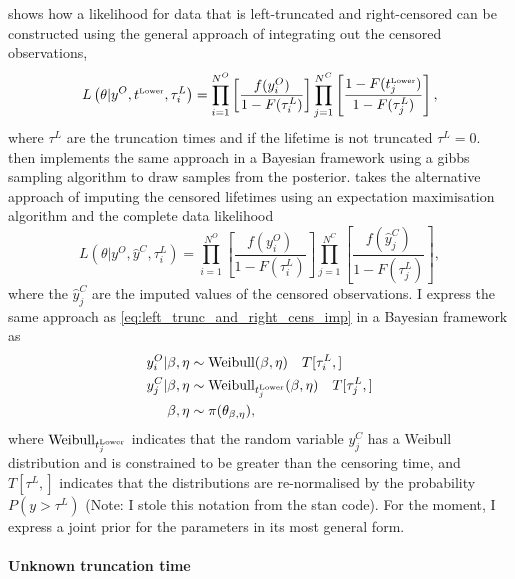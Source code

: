 \citet{hong2009} shows how a likelihood for data that is left-truncated and right-censored can be constructed using the general approach of integrating out the censored observations,
\begin{equation}
    \label{eq:left_trunc_and_right_cens_int}
    L\left(\theta|y^O, t^{\hbox{\tiny{Lower}}}, \tau^L_i\right) = \prod^{N^O}_{i = 1}\left[\frac{f(y^O_i)}{1 - F(\tau^L_i)} \right] \prod^{N^C}_{j = 1}\left[\frac{1 - F(t^{\hbox{\tiny{Lower}}}_j)}{1 - F(\tau^L_j)}\right],
\end{equation}
where $\tau^L$ are the truncation times and if the lifetime is not truncated $\tau^L = 0$. \citet{kundu2016} then implements the same approach in a Bayesian framework using a gibbs sampling algorithm to draw samples from the posterior. \citet{mitra2013} takes the alternative approach of imputing the censored lifetimes using an expectation maximisation algorithm and the complete data likelihood
\begin{equation}
    \label{eq:left_trunc_and_right_cens_imp}
    L\left(\theta|y^O, \hat{y}^C, \tau^L_i\right) = \prod^{N^O}_{i = 1}\left[\frac{f(y^O_i)}{1 - F(\tau^L_i)} \right] \prod^{N^C}_{j = 1}\left[\frac{f(\hat{y}^C_j)}{1 - F(\tau^L_j)}\right],
\end{equation}
where the $\hat{y}^C_j$ are the imputed values of the censored observations. I express the same approach as \ref{eq:left_trunc_and_right_cens_imp} in a Bayesian framework as
\begin{align*}
    y^O_i|\beta, \eta & \sim \hbox{Weibull}(\beta, \eta) \quad T[\tau^L_i, ]\\
    y^C_j|\beta, \eta & \sim \hbox{Weibull}_{t^{\hbox{\tiny{Lower}}}_j}(\beta, \eta) \quad T[\tau^L_j, ] \\
    \beta, \eta & \sim \pi(\theta_{\beta, \eta}),
\end{align*}
where $\hbox{Weibull}_{t^{\hbox{\tiny{Lower}}}_j}$ indicates that the random variable $y^C_j$ has a Weibull distribution and is constrained to be greater than the censoring time, and $T[\tau^L, ]$ indicates that the distributions are re-normalised by the probability $P(y > \tau^L)$ (Note: I stole this notation from the stan code). For the moment, I express a joint prior for the parameters in its most general form.

\paragraph{Unknown truncation time}

